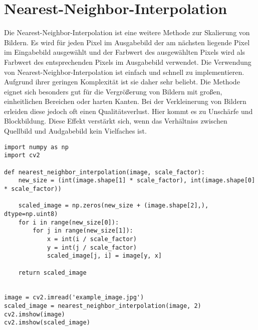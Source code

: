 \section{Nearest-Neighbor-Interpolation}
Die Nearest-Neighbor-Interpolation ist eine weitere Methode zur Skalierung von Bildern. 
Es wird für jeden Pixel im Ausgabebild der am nächsten liegende Pixel im Eingabebild ausgewählt und der Farbwert des ausgewählten Pixels wird als Farbwert des entsprechenden Pixels im Ausgabebild verwendet.
Die Verwendung von Nearest-Neighbor-Interpolation ist einfach und schnell zu implementieren. 
Aufgrund ihrer geringen Komplexität ist sie daher sehr beliebt. 
Die Methode eignet sich besonders gut für die Vergrößerung von Bildern mit großen, einheitlichen Bereichen oder harten Kanten. 
Bei der Verkleinerung von Bildern erleiden diese jedoch oft einen Qualitätsverlust.
Hier kommt es zu Unschärfe und Blockbildung. 
Diese Effekt verstärkt sich, wenn das Verhältniss zwischen Quellbild und Audgabebild kein Vielfaches ist. 
\begin{acronym}
\end{acronym}
\begin{lstlisting}
import numpy as np
import cv2

def nearest_neighbor_interpolation(image, scale_factor):
    new_size = (int(image.shape[1] * scale_factor), int(image.shape[0] * scale_factor))
    
    scaled_image = np.zeros(new_size + (image.shape[2],), dtype=np.uint8)
    for i in range(new_size[0]):
        for j in range(new_size[1]):
            x = int(i / scale_factor)
            y = int(j / scale_factor)
            scaled_image[j, i] = image[y, x]
    
    return scaled_image


image = cv2.imread('example_image.jpg')
scaled_image = nearest_neighbor_interpolation(image, 2)
cv2.imshow(image)
cv2.imshow(scaled_image)
\end{lstlisting}
